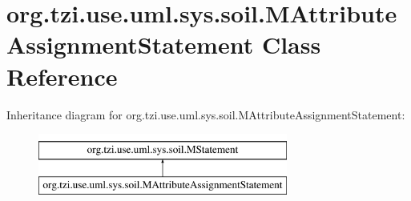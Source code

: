 \hypertarget{classorg_1_1tzi_1_1use_1_1uml_1_1sys_1_1soil_1_1_m_attribute_assignment_statement}{\section{org.\-tzi.\-use.\-uml.\-sys.\-soil.\-M\-Attribute\-Assignment\-Statement Class Reference}
\label{classorg_1_1tzi_1_1use_1_1uml_1_1sys_1_1soil_1_1_m_attribute_assignment_statement}
}
Inheritance diagram for org.\-tzi.\-use.\-uml.\-sys.\-soil.\-M\-Attribute\-Assignment\-Statement\-:\begin{figure}[H]
\begin{center}
\leavevmode
\includegraphics[height=2.000000cm]{classorg_1_1tzi_1_1use_1_1uml_1_1sys_1_1soil_1_1_m_attribute_assignment_statement}
\end{center}
\end{figure}
